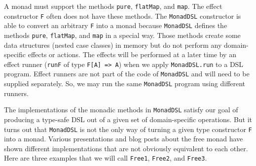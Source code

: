 A monad must support the methods \lstinline!pure!,
\lstinline!flatMap!, and
\lstinline!map!. The effect
constructor \lstinline!F!
often does not have these methods. The \lstinline!MonadDSL!
constructor is able to convert an arbitrary \lstinline!F!
into a monad because \lstinline!MonadDSL!
defines the methods \lstinline!pure!,
\lstinline!flatMap!, and
\lstinline!map! in a special
way. Those methods create some data structures (nested case classes)
in memory but do not perform any domain-specific effects or actions.
The effects will be performed at a later time by an effect runner
(\lstinline!runF! of type
\lstinline!F[A] => A!)
when we apply \lstinline!MonadDSL.run!
to a DSL program. Effect runners are not part of the code of \lstinline!MonadDSL!
and will need to be supplied separately. So, we may run the same \lstinline!MonadDSL!
program using different runners.

The implementations of the monadic methods in \lstinline!MonadDSL!
satisfy our goal of producing a type-safe DSL out of a given set of
domain-specific operations. But it turns out that \lstinline!MonadDSL!
is not the only way of turning a given type constructor \lstinline!F!
into a monad. Various presentations and blog posts about the free
monad have shown different implementations that are not obviously
equivalent to each other. Here are three examples that we will call
\lstinline!Free1!, \lstinline!Free2!,
and \lstinline!Free3!. 

